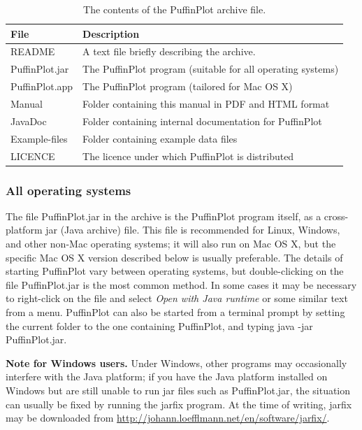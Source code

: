 \documentclass[a4paper,british]{article}
\newcommand{\ppcmd}[1]{\textsf{#1}} %
\begin{document}
\begin{table}[bp]
  \caption{\label{tbl:archive-contents} The contents of the PuffinPlot archive file.}
\begin{tabular}{ll} \toprule
File           & Description \\ \midrule
README         & A text file briefly describing the archive. \\
PuffinPlot.jar & The PuffinPlot program (suitable for all operating systems) \\
PuffinPlot.app & The PuffinPlot program (tailored for Mac OS X) \\
Manual         & Folder containing this manual in PDF and HTML format \\
JavaDoc        & Folder containing internal documentation for PuffinPlot \\
Example-files  & Folder containing example data files \\
LICENCE        & The licence under which PuffinPlot is distributed \\
\bottomrule
\end{tabular}
\end{table}

\subsubsection{All operating systems}

The file \textsf{PuffinPlot.jar} in the archive is the PuffinPlot program
itself, as a cross-platform jar (Java archive) file. This file is recommended
for Linux, Windows, and other non-Mac operating systems; it will also run on
Mac OS X, but the specific Mac OS X version described below is usually
preferable. The details of starting PuffinPlot vary between operating
systems, but double-clicking on the file \textsf{PuffinPlot.jar} is the most
common method. In some cases it may be necessary to right-click on the file
and select \emph{Open with Java runtime} or some similar text from a menu.
PuffinPlot can also be started from a terminal prompt by setting the current
folder to the one containing PuffinPlot, and typing \textsf{java -jar
  PuffinPlot.jar}.

\textbf{Note for Windows users.} Under Windows, other programs may
occasionally interfere with the Java platform; if you have the Java platform
installed on Windows but are still unable to run \ppcmd{jar} files such as
\ppcmd{PuffinPlot.jar}, the situation can usually be fixed by running the
\ppcmd{jarfix} program. At the time of writing, \ppcmd{jarfix} may be
downloaded from \url{http://johann.loefflmann.net/en/software/jarfix/}.
\end{document}
